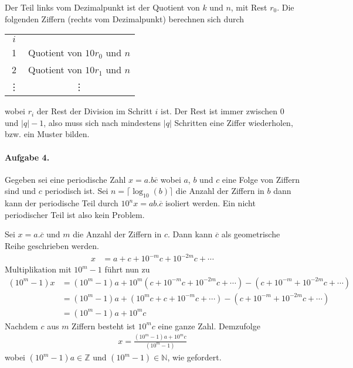 \documentclass{article}
\begin{document}
Der Teil links vom Dezimalpunkt ist der Quotient von $k$ und $n$, mit Rest $r_0$. Die folgenden Ziffern (rechts vom Dezimalpunkt) berechnen sich durch
\begin{center}
    \begin{tabular}{c c}
        $i$ &  \\
        1 & Quotient von $10r_0$ und $n$ \\
        2 & Quotient von $10r_1$ und $n$\\
        \vdots & \vdots \\
    \end{tabular}
\end{center}
wobei $r_i$ der Rest der Division im Schritt $i$ ist. Der Rest ist immer zwischen 0 und $|q| - 1$, also muss sich nach mindestens $|q|$ Schritten eine Ziffer wiederholen, bzw. ein Muster bilden.

\paragraph{Aufgabe 4.} Gegeben sei eine periodische Zahl $x = a.b\overline{c}$ wobei $a$, $b$ und $c$ eine Folge von Ziffern sind und $c$ periodisch ist. Sei $n = \lceil\log_{10}(b)\rceil$ die Anzahl der Ziffern in $b$ dann kann der periodische Teil durch $10^nx = ab.\overline{c}$ isoliert werden. Ein nicht periodischer Teil ist also kein Problem.

Sei $x = a.\overline{c}$ und $m$ die Anzahl der Ziffern in $c$. Dann kann $\overline{c}$ als geometrische Reihe geschrieben werden.
\begin{align*}
    x &= a + c + 10^{-m}c + 10^{-2m}c + \cdots
\end{align*}
Multiplikation mit $10^m - 1$ führt nun zu
\begin{align*}
    (10^m - 1)x &= (10^m - 1)a + 10^{m}(c + 10^{-m}c + 10^{-2m}c + \cdots) - (c + 10^{-m} + 10^{-2m}c + \cdots) \\
    &= (10^m - 1)a + (10^{m}c + c + 10^{-m}c + \cdots) - (c + 10^{-m} + 10^{-2m}c + \cdots) \\
    &= (10^m - 1)a + 10^{m}c
\end{align*}
Nachdem $c$ aus $m$ Ziffern besteht ist $10^mc$ eine ganze Zahl. Demzufolge
\begin{align*}
    x = \frac{(10^m - 1)a + 10^mc}{(10^m - 1)}
\end{align*}
wobei $(10^m - 1)a \in \mathbb{Z}$ und $(10^m - 1) \in \mathbb{N}$, wie gefordert.
\end{document}
